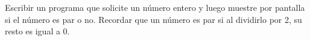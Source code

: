 Escribir un programa que solicite un n\'umero entero y luego muestre por pantalla si el n\'umero es par o no. Recordar que un n\'umero es par si al dividirlo por 2, su resto es igual a 0.



\volverindice
\newpage
